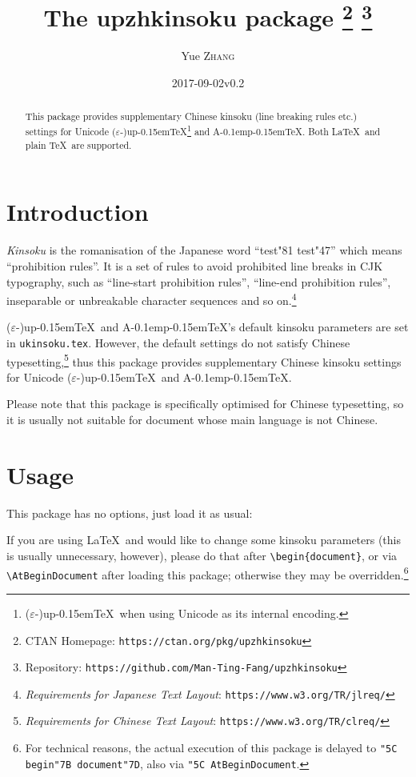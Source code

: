 \documentclass[a4paper]{article}
\newcommand\NormalSans{\normalfont\sffamily}
\newcommand\pkg[1]{{\protect\NormalSans#1}}
\newcommand\pTeX{p\kern-0.15em\TeX}
\newcommand\e{\ensuremath{\varepsilon}}
\newcommand\upTeX{u\pTeX}
\newcommand\ApTeX{A\kern-0.1em\pTeX}
\newcommand\kn{test}
\newcommand\sk{test}
\begin{document}
\title{The \pkg{upzhkinsoku} package%
  \thanks{CTAN Homepage: \texttt{https://ctan.org/pkg/upzhkinsoku}}
  \thanks{Repository: \texttt{https://github.com/Man-Ting-Fang/upzhkinsoku}}}
\author{Yue \textsc{Zhang}}
\date{2017-09-02\quad v0.2}

\maketitle

\begin{abstract}
This package provides supplementary Chinese kinsoku (line breaking rules etc.)
settings for Unicode (\e-)\upTeX\footnote{(\e-)\upTeX\ when using Unicode as its
internal encoding.} and \ApTeX. Both \LaTeX\ and plain \TeX\ are supported.
\end{abstract}

\section{Introduction}

\textit{Kinsoku} is the romanisation of the Japanese word ``{\kn\char"81\relax
\sk\char"47}'' which means ``prohibition rules''. It is a set of rules to avoid
prohibited line breaks in CJK typography, such as ``line-start prohibition
rules'', ``line-end prohibition rules'', inseparable or unbreakable character
sequences and so on.\footnote{\textit{Requirements for Japanese Text Layout}:
\texttt{https://www.w3.org/TR/jlreq/}}

(\e-)\upTeX\ and \ApTeX's default kinsoku parameters are set in
\verb|ukinsoku.tex|. However, the default settings do not satisfy Chinese
typesetting,\footnote{\textit{Requirements for Chinese Text Layout}:
\texttt{https://www.w3.org/TR/clreq/}} thus this package provides supplementary
Chinese kinsoku settings for Unicode (\e-)\upTeX\ and \ApTeX.

Please note that this package is specifically optimised for Chinese typesetting,
so it is usually not suitable for document whose main language is not Chinese.

\section{Usage}

This package has no options, just load it as usual:
If you are using \LaTeX\ and would like to change some kinsoku parameters (this
is usually unnecessary, however), please do that after \verb|\begin{document}|,
or via \verb|\AtBeginDocument| after loading this package; otherwise they may be
overridden.\footnote{For technical reasons, the actual execution of this package
is delayed to \texttt{\char"5C begin\char"7B document\char"7D}, also via
\texttt{\char"5C AtBeginDocument}.}
\end{document}
